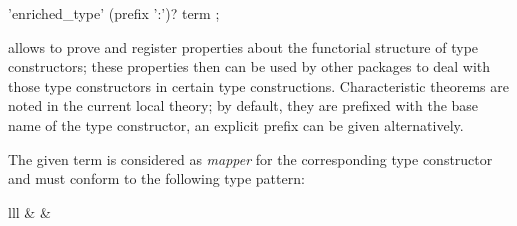 \begin{isabellebody}
\begin{isamarkuptext}
  \begin{rail}
    'enriched_type' (prefix ':')? term
    ;
  \end{rail}

  \begin{description}

  \item \hyperlink{command.HOL.enriched-type}{\mbox{}} allows to prove and register
  properties about the functorial structure of type constructors;
  these properties then can be used by other packages to
  deal with those type constructors in certain type constructions.
  Characteristic theorems are noted in the current local theory; by
  default, they are prefixed with the base name of the type constructor,
  an explicit prefix can be given alternatively.

  The given term  is considered as \emph{mapper} for the
  corresponding type constructor and must conform to the following
  type pattern:

  \begin{matharray}{lll}
     &  &
       \\
  \end{matharray}


\end{description}
\end{isamarkuptext}
\end{isabellebody}
